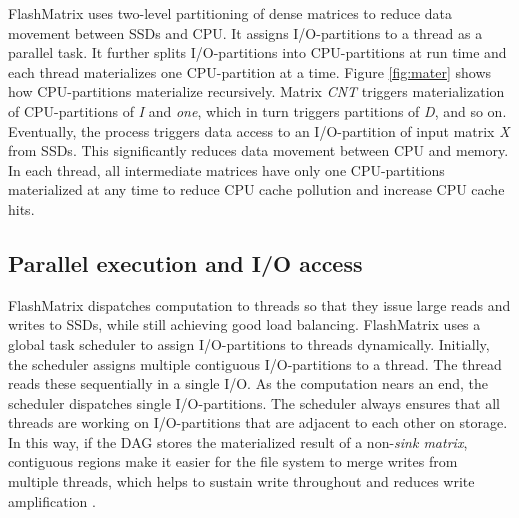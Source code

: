 FlashMatrix uses two-level partitioning of dense matrices
to reduce data movement between SSDs and CPU. It assigns I/O-partitions
to a thread as a parallel task.
It further splits I/O-partitions into CPU-partitions at run time 
and each thread materializes one CPU-partition at a time. 
Figure \ref{fig:mater} shows how CPU-partitions materialize recursively.
Matrix \textit{CNT} triggers materialization of CPU-partitions of 
\textit{I} and \textit{one}, which in turn triggers 
partitions of \textit{D}, and so on. Eventually, the process triggers data access
to an I/O-partition of input matrix \textit{X} from SSDs.
 This significantly reduces data movement between CPU and memory. In each
thread, all intermediate matrices have only one CPU-partitions materialized
at any time to reduce CPU cache pollution and increase CPU cache hits.



\subsection{Parallel execution and I/O access}
FlashMatrix dispatches computation to threads so that they
issue large reads and writes to SSDs, while still achieving good load balancing.
%
FlashMatrix uses a global task scheduler to assign 
I/O-partitions to threads dynamically. Initially,
the scheduler assigns multiple contiguous I/O-partitions to a thread.
The thread reads these sequentially in a single I/O.
As the computation nears an end, the scheduler dispatches single I/O-partitions. 
The scheduler always ensures that all threads are working on I/O-partitions that are adjacent to
each other on storage.
In this way, if the DAG stores the materialized result of a non-\textit{sink matrix}, 
contiguous regions make it easier for the file system to merge
writes from multiple threads, which helps to sustain write throughout and reduces
write amplification \cite{}.

